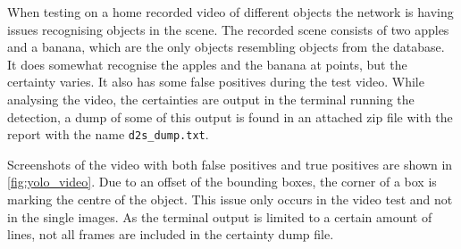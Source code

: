 When testing on a home recorded video of different objects the network is having issues recognising objects in the scene. The recorded scene consists of two apples and a banana, which are the only objects resembling objects from the database. It does somewhat recognise the apples and the banana at points, but the certainty varies. It also has some false positives during the test video. While analysing the video, the certainties are output in the terminal running the detection, a dump of some of this output is found in an attached zip file with the report with the name \lstinline|d2s_dump.txt|. 

Screenshots of the video with both false positives and true positives are shown in \autoref{fig:yolo_video}. Due to an offset of the bounding boxes, the corner of a box is marking the centre of the object. This issue only occurs in the video test and not in the single images. As the terminal output is limited to a certain amount of lines, not all frames are included in the certainty dump file.
